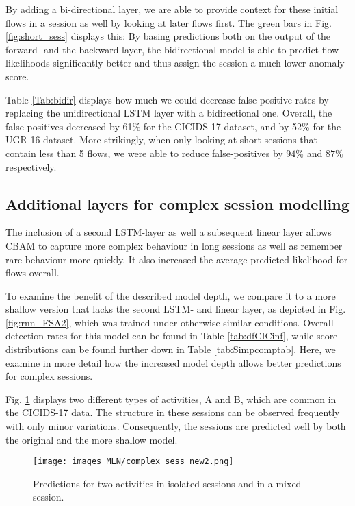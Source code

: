 By adding a bi-directional layer, we are able to provide context for these initial flows in a session as well by looking at later flows first. The green bars in Fig. \ref{fig:short_sess} displays this: By basing predictions both on the output of the forward- and the backward-layer, the bidirectional model is able to predict flow likelihoods significantly better and thus assign the session a much lower anomaly-score.




Table \ref{Tab:bidir} displays how much we could decrease false-positive rates by replacing the unidirectional LSTM layer with a bidirectional one. Overall, the false-positives decreased by 61\% for the CICIDS-17 dataset, and by 52\% for the UGR-16 dataset. More strikingly, when only looking at short sessions that contain less than 5 flows, we were able to reduce false-positives by $94\%$ and $87\%$ respectively.


\subsection{Additional layers for complex session modelling}\label{Sec:depth}



The inclusion of a second LSTM-layer as well a subsequent linear layer allows CBAM to capture more complex behaviour in long sessions as well as remember rare behaviour more quickly. It also increased the average predicted likelihood for flows overall. 

To examine the benefit of the described model depth, we compare it to a more shallow version that lacks the second LSTM- and linear layer, as depicted in Fig. \ref{fig:rnn_FSA2}, which was trained under otherwise similar conditions. Overall detection rates for this model can be found in Table \ref{tab:dfCICinf}, while score distributions can be found  further down in Table \ref{tab:Simpcomptab}. Here, we examine in more detail how the increased model depth allows better predictions for complex sessions. 

Fig. \ref{fig:complex_sess} displays two different types of activities, A and B, which are common in the CICIDS-17 data. The structure in these sessions can be observed frequently with only minor variations. Consequently, the sessions are predicted well by both the original and the more shallow model.
\begin{figure}[!ht]
\centering
\texttt{[image: images\_MLN/complex\_sess\_new2.png]} \caption{Predictions for two activities in isolated sessions and in a mixed session.}\label{fig:complex_sess}
\end{figure}


